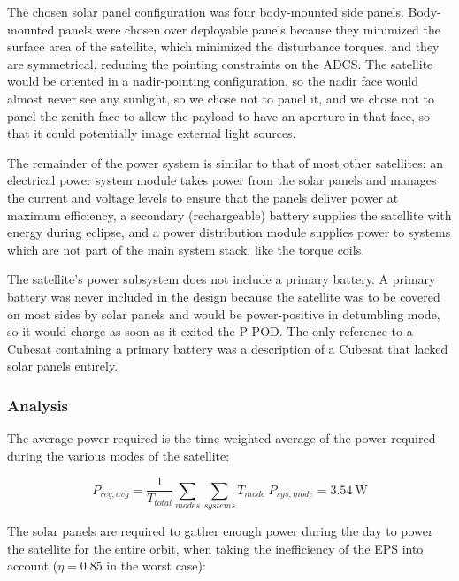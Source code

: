 \documentclass[12pt]{article}
\begin{document}
The chosen solar panel configuration was four body-mounted side panels.  Body-mounted panels were chosen over deployable panels because they minimized the surface area of the satellite, which minimized the disturbance torques, and they are symmetrical, reducing the pointing constraints on the ADCS.  The satellite would be oriented in a nadir-pointing configuration, so the nadir face would almost never see any sunlight, so we chose not to panel it, and we chose not to panel the zenith face to allow the payload to have an aperture in that face, so that it could potentially image external light sources.

The remainder of the power system is similar to that of most other satellites: an electrical power system module takes power from the solar panels and manages the current and voltage levels to ensure that the panels deliver power at maximum efficiency, a secondary (rechargeable) battery supplies the satellite with energy during eclipse, and a power distribution module supplies power to systems which are not part of the main system stack, like the torque coils.

The satellite's power subsystem does not include a primary battery.  A primary battery was never included in the design because the satellite was to be covered on most sides by solar panels and would be power-positive in detumbling mode, so it would charge as soon as it exited the P-POD.  The only reference to a Cubesat containing a primary battery was a description of a Cubesat that lacked solar panels entirely.\cite{libertad-1}
			
			\subsubsection{Analysis}\label{subsubsec:power-analysis}
			
The average power required is the time-weighted average of the power required during the various modes of the satellite:

\begin{equation}
P_{req,avg} = \frac{1}{T_{total}}\sum_{modes}{ \sum_{systems}{T_{mode} \: P_{sys,mode}} } = 3.54 \ \text{W} 
\label{eq:power-required}
\end{equation}

The solar panels are required to gather enough power during the day to power the satellite for the entire orbit, when taking the inefficiency of the EPS into account ($\eta = 0.85$ in the worst case\cite{EPS-manual}):
\end{document}
